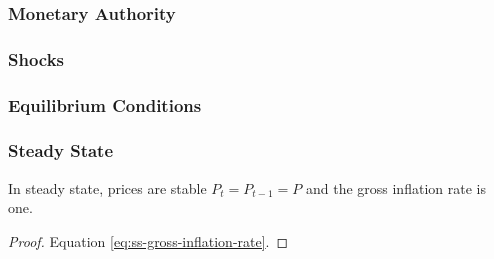 \documentclass[
thesis.tex
]{subfiles}
\begin{document}

\begin{definition}
	\cite[Lecture 1, p.5]{solis-garcia_ucb_2022}
\end{definition}

\begin{definition}
	\cite[Lecture 1, p.5]{solis-garcia_ucb_2022}
\end{definition}

\subsubsection{Monetary Authority}

\subsubsection{Shocks}

\subsubsection{Equilibrium Conditions}

\begin{definition}
	\cite[Lecture 1, p.6]{solis-garcia_ucb_2022}
\end{definition}


\subsubsection{Steady State}


\begin{lemma}\label{lemma:steady-state-inflation}
	
	In steady state, prices are stable $P_t = P_{t-1} = P$ and the gross inflation rate is one.
	\begin{proof} Equation \ref{eq:ss-gross-inflation-rate}. \end{proof}  \end{lemma}
\end{document}
